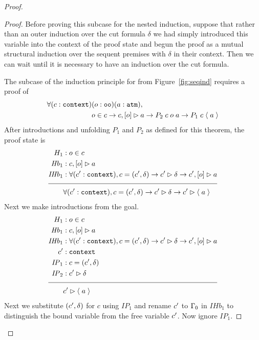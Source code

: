 \begin{proof}
\begin{proof}
Before proving this subcase for the nested induction, suppose that rather than an outer induction over the cut formula $\delta$ we had simply introduced this variable into the context of the proof state and begun the proof as a mutual structural induction over the sequent premises with $\delta$ in their context. Then we can wait until it is necessary to have an induction over the cut formula.

The subcase of the induction principle for \rlnmsinit{} from Figure~\ref{fig:seqind} requires a proof of
\begin{align*}
\forall (c : \sltm{context}) & (o : \sltm{oo}) (a : \sltm{atm}), \\
& o \in c \rightarrow \bchsl[c]{o}{a} \rightarrow P_2 \; c \; o \; a \rightarrow P_1 \; c \; \atom{a}
\end{align*}
After introductions and unfolding $P_1$ and $P_2$ as defined for this theorem, the proof state is
\begin{align*}
H_1 &: o \in c \\
\mathit{Hb}_1 &: \bchsl[c]{o}{a} \\
\mathit{IHb}_1 &: \forall (\inddyncon{} : \sltm{context}), c = (\inddyncon{}, \delta) \rightarrow \seqsl[\inddyncon{}]{\delta} \rightarrow \bchsl[\inddyncon{}]{o}{a} \\[\pfshift{}]
\cline{1-2}
& \forall (\inddyncon{} : \sltm{context}), c = (\inddyncon{}, \delta) \rightarrow \seqsl[\inddyncon{}]{\delta} \rightarrow \seqsl[\inddyncon{}]{\atom{a}}
\end{align*}
Next we make introductions from the goal.
\begin{align*}
H_1 &: o \in c \\
\mathit{Hb}_1 &: \bchsl[c]{o}{a} \\
\mathit{IHb}_1 &: \forall (\inddyncon{} : \sltm{context}), c = (\inddyncon{}, \delta) \rightarrow \seqsl[\inddyncon{}]{\delta} \rightarrow \bchsl[\inddyncon{}]{o}{a} \\
\inddyncon{} &: \sltm{context} \\
\mathit{IP}_1 &: c = (\inddyncon{}, \delta) \\
\mathit{IP}_2 &: \seqsl[\inddyncon{}]{\delta} \\[\pfshift{}]
\cline{1-2}
& \seqsl[\inddyncon{}]{\atom{a}}
\end{align*}
Next we substitute $(\inddyncon , \delta)$ for $c$ using $\mathit{IP}_1$ and rename $\inddyncon{}$ to $\dyncon{}_0$ in $\mathit{IHb}_1$ to distinguish the bound variable from the free variable $\inddyncon{}$. Now ignore $\mathit{IP}_1$.

\end{proof}
\end{proof}
